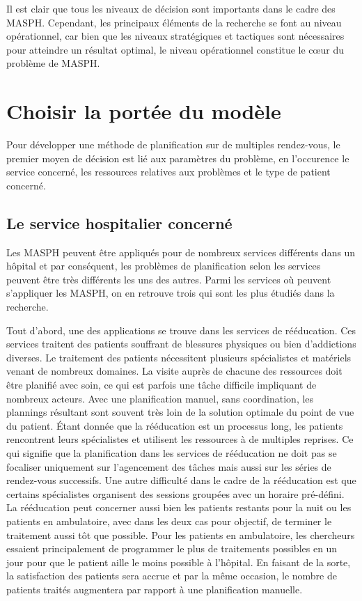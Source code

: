 \documentclass{polytech/polytech}
\begin{document}
Il est clair que tous les niveaux de décision sont importants dans le cadre des MASPH. Cependant, les principaux éléments de la recherche se font au niveau opérationnel, car bien que les niveaux stratégiques et tactiques sont nécessaires pour atteindre un résultat optimal, le niveau opérationnel constitue le cœur du problème de MASPH. 


\section{Choisir la portée du modèle}

Pour développer une méthode de planification sur de multiples rendez-vous, le premier moyen de décision est lié aux paramètres du problème, en l'occurence le service concerné, les ressources relatives aux problèmes et le type de patient concerné. 


\subsection{Le service hospitalier concerné}

Les MASPH peuvent être appliqués pour de nombreux services différents dans un hôpital et par conséquent, les problèmes de planification selon les services peuvent être très différents les uns des autres. Parmi les services où peuvent s'appliquer les MASPH, on en retrouve trois qui sont les plus étudiés dans la recherche. 

Tout d'abord, une des applications se trouve dans les services de rééducation. Ces services traitent des patients souffrant de blessures physiques ou bien d'addictions diverses. Le traitement des patients nécessitent plusieurs spécialistes et matériels venant de nombreux domaines. La visite auprès de chacune des ressources doit être planifié avec soin, ce qui est parfois une tâche difficile impliquant de nombreux acteurs. Avec une planification manuel, sans coordination, les plannings résultant sont souvent très loin de la solution optimale du point de vue du patient. Étant donnée que la rééducation est un processus long, les patients rencontrent leurs spécialistes et utilisent les ressources à de multiples reprises. Ce qui signifie que la planification dans les services de rééducation ne doit pas se focaliser uniquement sur l'agencement des tâches mais aussi sur les séries de rendez-vous successifs. Une autre difficulté dans le cadre de la rééducation est que certains spécialistes organisent des sessions groupées avec un horaire pré-défini. La rééducation peut concerner aussi bien les patients restants pour la nuit ou les patients en ambulatoire, avec dans les deux cas pour objectif, de terminer le traitement aussi tôt que possible. Pour les patients en ambulatoire, les chercheurs essaient principalement de programmer le plus de traitements possibles en un jour pour que le patient aille le moins possible à l'hôpital. En faisant de la sorte, la satisfaction des patients sera accrue et par la même occasion, le nombre de patients traités augmentera par rapport à une planification manuelle. 
\end{document}
